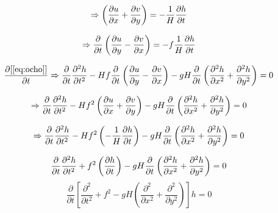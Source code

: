 \documentclass{article}
\newcommand\pder[2]{\ensuremath {\dfrac{\partial#1}{\partial#2}}}
\newcommand{\ppder}[2]{ \ensuremath {\dfrac{\partial^2 #1}{\partial #2^2}}}
\begin{document}
\begin{equation}
	[\eqref{eq:continuidad}] \Rightarrow
	\uxpvy = -\frac1H \pder{h}{t}
	\label{eq:tres.uno}
\end{equation}

\begin{equation}
	[\eqref{eq:tres.uno} \text{ y } \eqref{eq:once}] \Rightarrow
	\pder{}{t} \uymvx = -f\frac1H \pder{h}{t}
	\label{eq:doce}
\end{equation}

\begin{equation}
	\pder{[\eqref{eq:ocho}]}{t} \Rightarrow
	\pder{}{t}\ppder{h}{t} - Hf\pder{}{t}\uymvx - gH \pder{}{t}\hxphy = 0
	\label{eq:trece}
\end{equation}

\begin{equation}
	[\eqref{eq:once} \text{ y } \eqref{eq:trece}] \Rightarrow
	\pder{}{t}\ppder{h}{t}
	- Hf^2\uxpvy - gH \pder{}{t}\hxphy = 0
	\label{eq:catorce}
\end{equation}

\begin{equation}
	[\eqref{eq:tres.uno} \text{ y } \eqref{eq:catorce}] \Rightarrow
	\pder{}{t}\ppder{h}{t}
	- Hf^2 \left(-\frac1H \pder{h}{t}\right) - gH \pder{}{t}\hxphy = 0
	\label{eq:quince}
\end{equation}

\begin{equation}
	\pder{}{t}\ppder{h}{t}
	+ f^2 \left(\pder{h}{t}\right) - gH \pder{}{t}\hxphy = 0
\end{equation}
\begin{equation}
	\pder{}{t}\left[\ppder{}{t}
	+ f^2 - gH\left(\ppder{}{x}+\ppder{}{y}\right)\right]h = 0
\end{equation}
\end{document}
